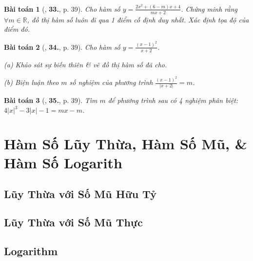 \documentclass[12pt]{article}
\numberwithin{equation}{section}
\newtheorem{baitoan}{Bài toán}[section]
\begin{document}
\begin{baitoan}[\cite{TL_chuyen_Toan_Giai_Tich_12}, \textbf{33.}, p. 39]
	Cho hàm số $y = \frac{2x^2 + (6 - m)x + 4}{mx + 2}$. Chứng minh rằng $\forall m\in\mathbb{R}$, đồ thị hàm số luôn đi qua 1 điểm cố định duy nhất. Xác định tọa độ của điểm đó.
\end{baitoan}

\begin{baitoan}[\cite{TL_chuyen_Toan_Giai_Tich_12}, \textbf{34.}, p. 39]
	Cho hàm số $y = \frac{(x - 1)^2}{x + 2}$.
	\begin{enumerate*}
		\item[(a)] Khảo sát sự biến thiên \& vẽ đồ thị hàm số đã cho.
		\item[(b)] Biện luận theo $m$ số nghiệm của phương trình $\frac{(x - 1)^2}{|x + 2|} = m$.
	\end{enumerate*}
\end{baitoan}

\begin{baitoan}[\cite{TL_chuyen_Toan_Giai_Tich_12}, \textbf{35.}, p. 39]
	Tìm $m$ để phương trình sau có 4 nghiệm phân biệt: $4|x|^3 - 3|x| - 1 = mx - m$.
\end{baitoan}


\section{Hàm Số Lũy Thừa, Hàm Số Mũ, \& Hàm Số Logarith}

\subsection{Lũy Thừa với Số Mũ Hữu Tỷ}


\subsection{Lũy Thừa với Số Mũ Thực}


\subsection{Logarithm}
\end{document}
